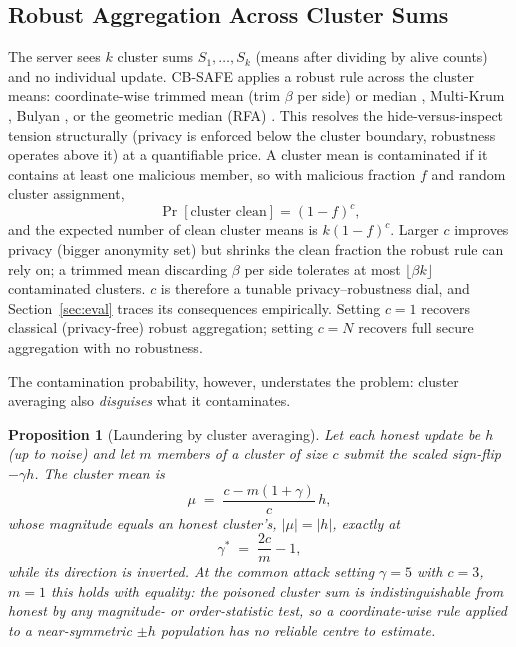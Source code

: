 \documentclass[lettersize,journal]{IEEEtran}
\newtheorem{proposition}{Proposition}
\begin{document}
\subsection{Robust Aggregation Across Cluster Sums}\label{sec:tradeoff}
The server sees $k$ cluster sums $S_1,\dots,S_k$ (means after dividing by alive
counts) and no individual update. CB-SAFE applies a robust rule across the cluster
means: coordinate-wise trimmed mean (trim $\beta$ per side) or median \cite{yin2018},
Multi-Krum \cite{blanchard2017}, Bulyan \cite{bulyan}, or the geometric median
(RFA) \cite{rfa}. This resolves the hide-versus-inspect tension structurally (privacy
is enforced below the cluster boundary, robustness operates above it) at a
quantifiable price. A cluster mean is contaminated if it contains at least one
malicious member, so with malicious fraction $f$ and random cluster assignment,
\begin{equation}\label{eq:contam}
\Pr[\text{cluster clean}] = (1-f)^{c},
\end{equation}
and the expected number of clean cluster means is $k(1-f)^c$. Larger $c$ improves
privacy (bigger anonymity set) but shrinks the clean fraction the robust rule can
rely on; a trimmed mean discarding $\beta$ per side tolerates at most
$\lfloor \beta k \rfloor$ contaminated clusters. $c$ is therefore a tunable
privacy--robustness dial, and Section~\ref{sec:eval} traces its consequences
empirically. Setting $c{=}1$ recovers classical (privacy-free) robust aggregation;
setting $c{=}N$ recovers full secure aggregation with no robustness.

The contamination probability, however, understates the problem: cluster averaging
also \emph{disguises} what it contaminates.

\begin{proposition}[Laundering by cluster averaging]\label{prop:launder}
Let each honest update be $h$ (up to noise) and let $m$ members of a cluster of size
$c$ submit the scaled sign-flip $-\gamma h$. The cluster mean is
\begin{equation}\label{eq:launder}
\mu \;=\; \frac{c - m(1+\gamma)}{c}\, h ,
\end{equation}
whose magnitude equals an honest cluster's, $|\mu| = |h|$, exactly at
\begin{equation}\label{eq:gammastar}
\gamma^{*} \;=\; \frac{2c}{m} - 1 ,
\end{equation}
while its direction is inverted.
At the common attack setting $\gamma{=}5$ with $c{=}3$, $m{=}1$ this holds with
equality: the poisoned cluster sum is indistinguishable from honest by any
magnitude- or order-statistic test, so a coordinate-wise rule applied to a
near-symmetric $\pm h$ population has no reliable centre to estimate.
\end{proposition}
\end{document}
